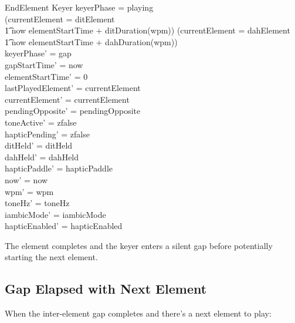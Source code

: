 \documentclass[a4paper,10pt,fleqn]{article}
\begin{document}
\begin{schema}{EndElement}
\Delta Keyer
\where
keyerPhase = playing \\
(currentElement = ditElement \land \\
\t1 now \geq elementStartTime + ditDuration(wpm)) \lor
(currentElement = dahElement \land \\
\t1 now \geq elementStartTime + dahDuration(wpm)) \\
keyerPhase' = gap \\
gapStartTime' = now \\
elementStartTime' = 0 \\
lastPlayedElement' = currentElement \\
currentElement' = currentElement \\
pendingOpposite' = pendingOpposite \\
toneActive' = zfalse \\
hapticPending' = zfalse \\
ditHeld' = ditHeld \\
dahHeld' = dahHeld \\
hapticPaddle' = hapticPaddle \\
now' = now \\
wpm' = wpm \\
toneHz' = toneHz \\
iambicMode' = iambicMode \\
hapticEnabled' = hapticEnabled
\end{schema}

The element completes and the keyer enters a silent gap before potentially
starting the next element.

\subsection{Gap Elapsed with Next Element}

When the inter-element gap completes and there's a next element to play:
\end{document}
